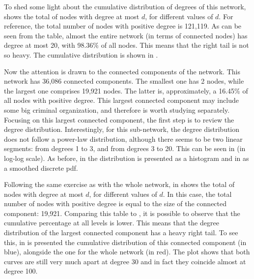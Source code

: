 \documentclass[11pt, english]{article}
\begin{document}
\begin{multicols}{2}
To shed some light about the cumulative distribution of degrees of this network,  shows the total of nodes with degree at most $d$, for different values of $d$. For reference, the total number of nodes with positive degree is 121,119. As can be seen from the table, almost the entire network (in terms of connected nodes) has degree at most 20, with 98.36\% of all nodes. This means that the right tail is not so heavy. The cumulative distribution is shown in .

Now the attention is drawn to the connected components of the network. This network has 36,086 connected components. The smallest one has 2 nodes, while the largest one comprises 19,921 nodes. The latter is, approximately, a 16.45\% of all nodes with positive degree. This largest connected component may include some big criminal organization, and therefore is worth studying separately. Focusing on this largest connected component, the first step is to review the degree distribution. Interestingly, for this sub-network, the degree distribution does not follow a power-law distribution, although there seems to be two linear segments: from degrees 1 to 3, and from degrees 3 to 20. This can be seen in  (in log-log scale). As before, in  the distribution is presented as a histogram and in  as a smoothed discrete pdf.

Following the same exercise as with the whole network, in  shows the total of nodes with degree at most $d$, for different values of $d$. In this case, the total number of nodes with positive degree is equal to the size of the connected component: 19,921. Comparing this table to , it is possible to observe that the cumulative percentage at all levels is lower. This means that the degree distribution of the largest connected component has a heavy right tail. To see this, in  is presented the cumulative distribution of this connected component (in blue), alongside the one for the whole network (in red). The plot shows that both curves are still very much apart at degree 30 and in fact they coincide almost at degree 100.


\end{multicols}
\end{document}
